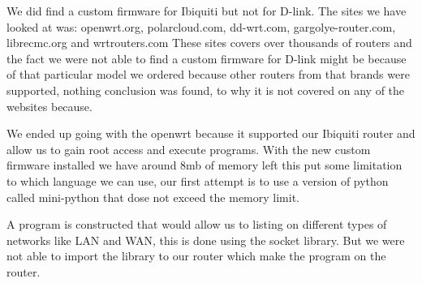 We did find a custom firmware for Ibiquiti but not for D-link. The sites we have looked at was: openwrt.org, polarcloud.com, dd-wrt.com, gargolye-router.com, librecmc.org and wrtrouters.com These sites covers over thousands of routers and the fact we were not able to find a custom firmware for D-link might be because of that particular model we ordered because other routers from that brands were supported, nothing conclusion was found, to why it is not covered on any of the websites because.

We ended up going with the openwrt because it supported our Ibiquiti router and allow us to gain root access and execute programs. With the new custom firmware installed we have around 8mb of memory left this put some limitation to which language we can use, our first attempt is to use a version of python called mini-python that dose not exceed the memory limit.

A program is constructed that would allow us to listing on different types of networks like LAN and WAN, this is done using the socket library. But we were not able to import the library to our router which make the program on the router.